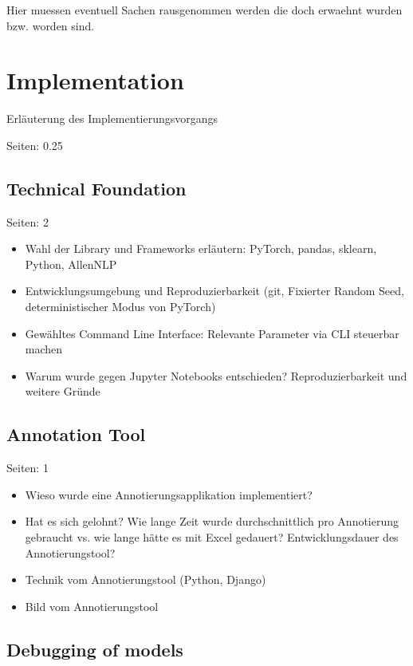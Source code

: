 \documentclass[draft,final,oneside]{vutinfth} %
\begin{document}
Hier muessen eventuell Sachen rausgenommen werden die doch erwaehnt wurden bzw. worden sind.
\fi

\chapter{Implementation} \label{implementationchapter}

Erläuterung des Implementierungsvorgangs

Seiten: 0.25

\section{Technical Foundation}

Seiten: 2

\begin{itemize}

\item Wahl der Library und Frameworks erläutern: PyTorch, pandas, sklearn, Python, AllenNLP
\item Entwicklungsumgebung und Reproduzierbarkeit (git, Fixierter Random Seed, deterministischer Modus von PyTorch)
\item Gewähltes Command Line Interface: Relevante Parameter via CLI steuerbar machen
\item Warum wurde gegen Jupyter Notebooks entschieden? Reproduzierbarkeit und weitere Gründe

\end{itemize}

\section{Annotation Tool}

Seiten: 1

\begin{itemize}
\item Wieso wurde eine Annotierungsapplikation implementiert?
\item Hat es sich gelohnt? Wie lange Zeit wurde durchschnittlich pro Annotierung gebraucht vs. wie lange hätte es mit Excel gedauert? Entwicklungsdauer des Annotierungstool?
\item Technik vom Annotierungstool (Python, Django)
\item Bild vom Annotierungstool
\end{itemize}


\section{Debugging of models}
\end{document}

